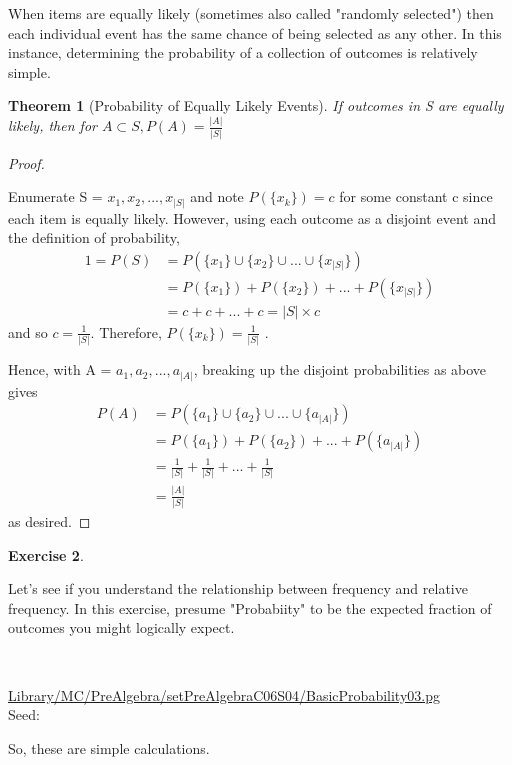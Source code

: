 \documentclass[10pt,]{book}
\theoremstyle{plain}
\newtheorem{theorem}{Theorem}[section]
\theoremstyle{definition}
\theoremstyle{definition}
\theoremstyle{definition}
\newtheorem{exercise}[theorem]{Exercise}
\numberwithin{equation}{section}
\begin{document}
	When items are equally likely (sometimes also called "randomly selected") then each individual event has the same chance of being selected as any other. In this instance, determining the probability of a collection of outcomes is relatively simple.
\begin{theorem}[{Probability of Equally Likely Events}]\label{theorem-17}
If outcomes in S are equally likely, then for \(A \subset S, P(A) = \frac{|A|}{|S|}\)\end{theorem}
\begin{proof}\hypertarget{proof-16}{}

	Enumerate S = {\(x_1, x_2, ..., x_{|S|}\)} and note \(P( \{ x_k \} ) = c\) for some constant c since each item is equally likely. However, using each outcome as a disjoint event and the definition of probability, 
	\begin{align*}
1 = P(S) & = P( \{ x_1 \} \cup \{x_2 \} \cup ... \cup \{x_{|S|} \} )\\
 & = P(\{ x_1 \}) + P(\{ x_2 \} ) + ... + P(\{ x_{|S|} \} )\\
 & = c + c + ... + c = {|S|} \times c
\end{align*}
	and so \(c = \frac{1}{{|S|}}\). Therefore, \(P( \{ x_k \} ) = \frac{1}{|S|}\) .
\par

	Hence, with A = {\(a_1, a_2, ..., a_{|A|}\)}, breaking up the disjoint probabilities as above gives
	\begin{align*}
P(A) & = P( \{ a_1 \} \cup \{ a_2 \} \cup ... \cup \{ a_{|A|} \} )\\
 & = P(\{ a_1 \}) + P(\{ a_2 \} ) + ... + P(\{ a_{|A|} \} )\\
 & = \frac{1}{{|S|}} + \frac{1}{{|S|}} + ... + \frac{1}{{|S|}}\\
 & = \frac{|A|}{{|S|}}
\end{align*}
	as desired.
\end{proof}
\begin{exercise}\label{exercise-16}

		Let's see if you understand the relationship between frequency and relative frequency. In this exercise, presume "Probabiity" to be the expected fraction of outcomes you might logically expect.
\par\medskip
\mbox{}\\ %
\begin{mdframed}
{}\par\vspace*{2ex}%
{\tiny\ttfamily\noindent\url{Library/MC/PreAlgebra/setPreAlgebraC06S04/BasicProbability03.pg}\\Seed: \hfill}\end{mdframed}
\medskip\noindent 
		So, these are simple calculations.
\par
\end{exercise}
\end{document}
